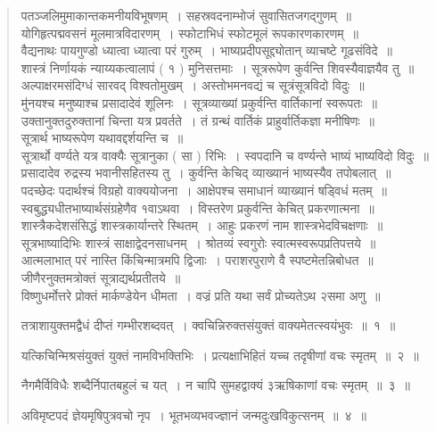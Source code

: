 \documentclass[11pt, openany]{book}
\begin{document}
\begin{quote}
{\qt पतञ्जलिमुमाकान्तकमनीयविभूषणम्~। सहस्रवदनाम्भोजं सुवासितजगद्गुणम्~॥\\
योगिहृत्पद्मवसनं मूलमात्रविदारणम्~। स्फोटाभिधं स्फोटमूलं रूपकारणकारणम्~॥\\
वैद्यनाथः पायगुण्डो ध्यात्वा ध्यात्वा परं गुरुम्~। भाष्यप्रदीपसूद्द्योतान् व्याचष्टे गूढसंविदे~॥\\
शास्त्रं निर्णायकं न्याय्यकत्वालापं ( १ ) मुनिसत्तमाः~। सूत्ररूपेण कुर्वन्ति शिवस्यैवाज्ञयैव तु~॥\\
अल्पाक्षरमसंदिग्धं सारवद् विश्वतोमुखम्~। अस्तोभमनवद्यं च सूत्रंसूत्रविदो विदुः~॥\\
मु॑नयश्च मनुष्याश्च प्रसादादेवं शूलिनः~। सूत्रव्याख्यां प्रकुर्वन्ति वार्तिकानां स्वरूपतः~॥\\
उक्तानुक्तदुरुक्तानां चिन्ता यत्र प्रवर्तते~। तं ग्रन्थं वार्तिकं प्राहुर्वार्तिकज्ञा मनीषिणः~॥\\
सूत्रार्थ भाष्यरूपेण यथावद्दर्शयन्ति च~॥ \\
सूत्रार्थो वर्ण्यते यत्र वाक्यैः सूत्रानुका ( सा ) रिभिः~। स्वपदानि च वर्ण्यन्ते भाष्यं भाष्यविदो विदुः~॥\\
प्रसादादेव रुद्रस्य भवानीसहितस्य तु~। कुर्वन्ति केचिद् व्याख्यानं भाष्यस्यैव तपोबलात्~॥\\
पदच्छेदः पदार्थश्चं विग्रहो वाक्ययोजना~। आक्षेपश्च समाधानं व्याख्यानं षड्विधं मतम्~॥\\
स्वबुद्ध्यधीतभाष्यार्थसंग्रहेणैव १वाऽथवा~। विस्तरेण प्रकुर्वन्ति केचित् प्रकरणात्मना~॥\\
शास्त्रैकदेशसंसिद्धं शास्त्रकार्यान्तरे स्थितम्~। आहुः प्रकरणं नाम शास्त्रभेदविचक्षणाः~॥\\
सूत्रभाष्यादिभिः शास्त्रं साक्षाद्वेदनसाधनम्~। श्रोतव्यं स्वगुरोः स्वात्मस्वरूपप्रतिपत्तये~॥\\
आत्मलाभात् परं नास्ति किंचिन्मात्रमपि द्विजाः~। पराशरपुराणे वै स्पष्टमेतन्निबोधत~॥\\
जीणैरनुक्तमत्रोक्तं सूत्राद्यर्थप्रतीतये~॥ \\
विष्णुधर्मोत्तरे प्रोक्तं मार्कण्डेयेन धीमता~। वज्रं प्रति यथा सर्वं प्रोच्यतेऽथ २समा अणु~॥}

{\mbh तत्राशायुक्तमद्वैधं दीप्तं गम्भीरशब्दवत्~। क्वचिन्निरुक्तसंयुक्तं वाक्यमेतत्स्वयंभुवः~॥~१~॥

यत्किचिन्मिश्रसंयुक्तं युक्तं नामविभक्तिभिः~। प्रत्यक्षाभिहितं यच्च तदृषीणां वचः स्मृतम्~॥~२~॥

नैगमैर्विविधैः शब्दैर्निपातबहुलं च यत्~। न चापि सुमहद्वाक्यं ३ऋषिकाणां वचः स्मृतम्~॥~३~॥

अविमृष्टपदं ज्ञेयमृषिपुत्रवचो नृप~। भूतभव्यभवज्ज्ञानं जन्मदुःखविकुत्सनम्~॥~४~॥

}
\end{quote}
\end{document}
